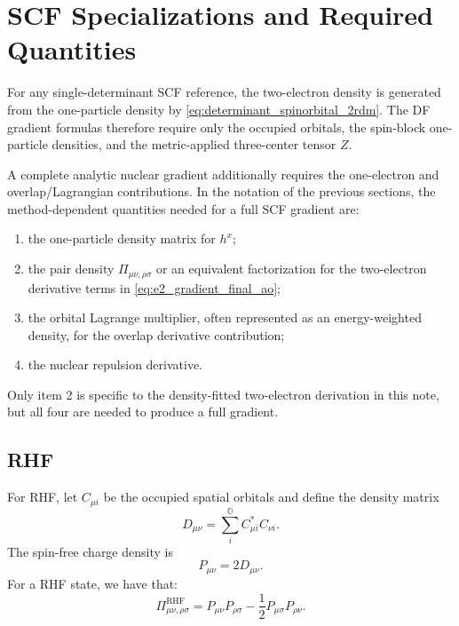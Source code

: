 \documentclass[aip,preprint]{revtex4-1}
\newcommand{\pert}{x}
\begin{document}
\section{SCF Specializations and Required Quantities}
\label{sec:scf_requirements}

For any single-determinant SCF reference, the two-electron density is generated
from the one-particle density by \cref{eq:determinant_spinorbital_2rdm}.  The
DF gradient formulas therefore require only the occupied orbitals, the
spin-block one-particle densities, and the metric-applied three-center tensor
$Z$.

A complete analytic nuclear gradient additionally requires the one-electron
and overlap/Lagrangian contributions.  In the notation of the previous
sections, the method-dependent quantities needed for a full SCF gradient are:
\begin{enumerate}
\item the one-particle density matrix for $h^{\pert}$;
\item the pair density $\Pi_{\mu\nu,\rho\sigma}$ or an equivalent factorization for the
      two-electron derivative terms in \cref{eq:e2_gradient_final_ao};
\item the orbital Lagrange multiplier, often represented as an
      energy-weighted density, for the overlap derivative contribution;
\item the nuclear repulsion derivative.
\end{enumerate}
Only item 2 is specific to the density-fitted two-electron derivation in this
note, but all four are needed to produce a full gradient.

\subsection{RHF}

For RHF, let $C_{\mu i}$ be the occupied spatial orbitals and define the
density matrix
\begin{equation}
D_{\mu\nu}
=
\sum_i^{\mathbb{O}}
C^*_{\mu i}C_{\nu i}.
\end{equation}
The spin-free charge density is
\begin{equation}
P_{\mu\nu}=2D_{\mu\nu}.
\end{equation}
For a RHF state, we have that:
\begin{equation}
\Pi_{\mu\nu,\rho\sigma}^{\mathrm{RHF}}
=
P_{\mu\nu}P_{\rho\sigma}
-
\frac{1}{2}P_{\mu\sigma}P_{\rho\nu}.
\end{equation}
\end{document}
